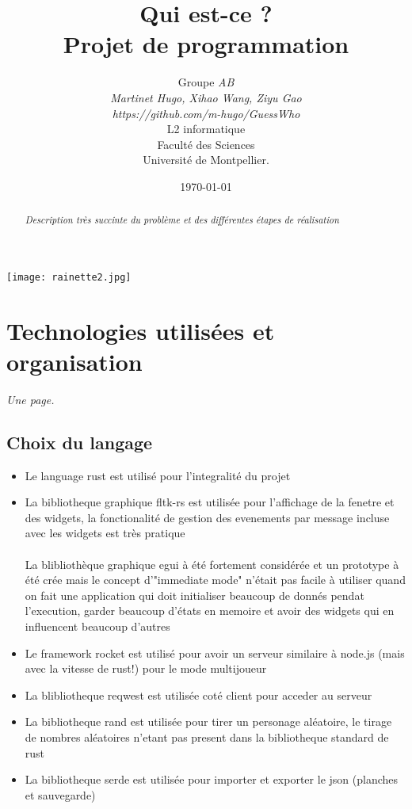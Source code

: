 \documentclass[a4paper]{article}
\title{  Qui est-ce ?\\         %
  Projet de programmation}
\author{Groupe \emph{AB}\\
  \emph{Martinet Hugo, Xihao Wang, Ziyu Gao}\\
  \emph{https://github.com/m-hugo/GuessWho}\\
  L2 informatique\\
  Faculté des Sciences\\
Université de Montpellier.}
\date{\today}
\begin{document}
\maketitle                    %

\begin{center}               %
  \texttt{[image: rainette2.jpg]}   %
\end{center}

\begin{abstract}     %

  \emph{Description très succinte du problème et des différentes étapes de réalisation}

\end{abstract}


\section{ Technologies utilisées  et organisation} %

\emph{Une page.}

\subsection{Choix du langage}         %

\begin{itemize}            %
\item
  Le language rust est utilisé pour l'integralité du projet
\item
   La bibliotheque graphique fltk-rs est utilisée pour l'affichage de la fenetre et des widgets, la fonctionalité de gestion des evenements par message incluse avec les widgets est très pratique\\\\
   La blibliothèque graphique egui à été fortement considérée et un prototype à été crée mais le concept d'"immediate mode" n'était pas facile à utiliser quand on fait une application qui doit initialiser beaucoup de donnés pendat l'execution, garder beaucoup d'états en memoire et avoir des widgets qui en influencent beaucoup d'autres 
\item 
   Le framework rocket est utilisé pour avoir un serveur similaire à node.js (mais avec la vitesse de rust!) pour le mode multijoueur
\item
	La blibliotheque reqwest est utilisée coté client pour acceder au serveur
\item
	La bibliotheque rand est utilisée pour tirer un personage aléatoire, le tirage de nombres aléatoires n'etant pas present dans la bibliotheque standard de rust
\item
	La bibliotheque serde est utilisée pour importer et exporter le json (planches et sauvegarde)
   
\end{itemize}
\end{document}
